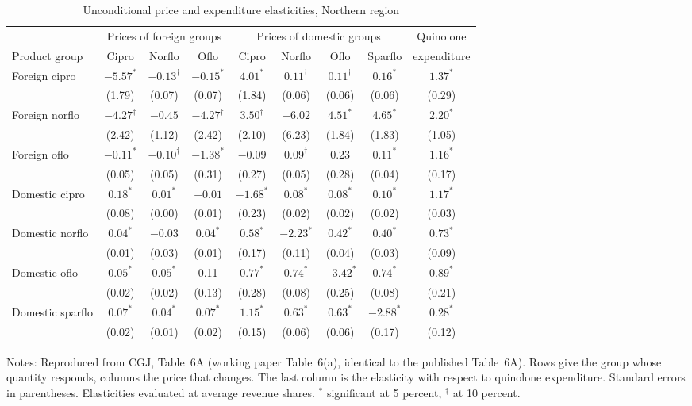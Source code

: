 \begin{table}[htbp]
\centering
\caption{Unconditional price and expenditure elasticities, Northern region}\label{tab:05-cgj-table6a}
\footnotesize
\setlength{\tabcolsep}{4pt}
\begin{tabular}{lcccccccc}
\toprule
 & \multicolumn{3}{c}{Prices of foreign groups} & \multicolumn{4}{c}{Prices of domestic groups} & Quinolone \\
\cmidrule(lr){2-4}\cmidrule(lr){5-8}
Product group & Cipro & Norflo & Oflo & Cipro & Norflo & Oflo & Sparflo & expenditure \\
\midrule
Foreign cipro & $-5.57^{*}$ & $-0.13^{\dagger}$ & $-0.15^{*}$ & $4.01^{*}$ & $0.11^{\dagger}$ & $0.11^{\dagger}$ & $0.16^{*}$ & $1.37^{*}$ \\
 & (1.79) & (0.07) & (0.07) & (1.84) & (0.06) & (0.06) & (0.06) & (0.29) \\
Foreign norflo & $-4.27^{\dagger}$ & $-0.45$ & $-4.27^{\dagger}$ & $3.50^{\dagger}$ & $-6.02$ & $4.51^{*}$ & $4.65^{*}$ & $2.20^{*}$ \\
 & (2.42) & (1.12) & (2.42) & (2.10) & (6.23) & (1.84) & (1.83) & (1.05) \\
Foreign oflo & $-0.11^{*}$ & $-0.10^{\dagger}$ & $-1.38^{*}$ & $-0.09$ & $0.09^{\dagger}$ & 0.23 & $0.11^{*}$ & $1.16^{*}$ \\
 & (0.05) & (0.05) & (0.31) & (0.27) & (0.05) & (0.28) & (0.04) & (0.17) \\
Domestic cipro & $0.18^{*}$ & $0.01^{*}$ & $-0.01$ & $-1.68^{*}$ & $0.08^{*}$ & $0.08^{*}$ & $0.10^{*}$ & $1.17^{*}$ \\
 & (0.08) & (0.00) & (0.01) & (0.23) & (0.02) & (0.02) & (0.02) & (0.03) \\
Domestic norflo & $0.04^{*}$ & $-0.03$ & $0.04^{*}$ & $0.58^{*}$ & $-2.23^{*}$ & $0.42^{*}$ & $0.40^{*}$ & $0.73^{*}$ \\
 & (0.01) & (0.03) & (0.01) & (0.17) & (0.11) & (0.04) & (0.03) & (0.09) \\
Domestic oflo & $0.05^{*}$ & $0.05^{*}$ & 0.11 & $0.77^{*}$ & $0.74^{*}$ & $-3.42^{*}$ & $0.74^{*}$ & $0.89^{*}$ \\
 & (0.02) & (0.02) & (0.13) & (0.28) & (0.08) & (0.25) & (0.08) & (0.21) \\
Domestic sparflo & $0.07^{*}$ & $0.04^{*}$ & $0.07^{*}$ & $1.15^{*}$ & $0.63^{*}$ & $0.63^{*}$ & $-2.88^{*}$ & $0.28^{*}$ \\
 & (0.02) & (0.01) & (0.02) & (0.15) & (0.06) & (0.06) & (0.17) & (0.12) \\
\bottomrule
\end{tabular}
\par\smallskip
\begin{minipage}{0.95\textwidth}\footnotesize
Notes: Reproduced from CGJ, Table~6A (working paper Table~6(a), identical to the published Table~6A). Rows give the
group whose quantity responds, columns the price that changes. The last column is the elasticity with respect to
quinolone expenditure. Standard errors in parentheses. Elasticities evaluated at average revenue shares.
$^{*}$ significant at 5 percent, $^{\dagger}$ at 10 percent.
\end{minipage}
\end{table}


